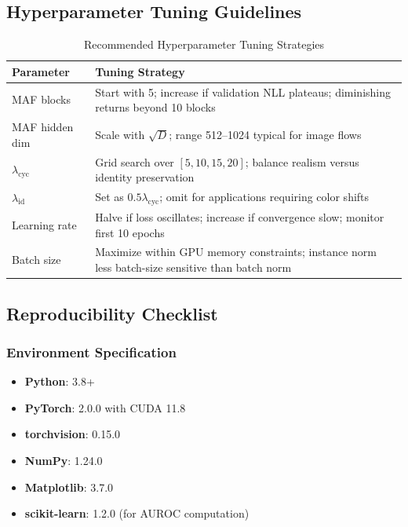 \documentclass[conference]{IEEEtran}
\begin{document}
\subsection{Hyperparameter Tuning Guidelines}
\begin{table}[!t]
\caption{Recommended Hyperparameter Tuning Strategies}
\label{tab:tuning}
\centering
\begin{tabular}{p{2.5cm}p{5cm}}
\hline
\textbf{Parameter} & \textbf{Tuning Strategy} \\
\hline
MAF blocks & Start with 5; increase if validation NLL plateaus; diminishing returns beyond 10 blocks \\
MAF hidden dim & Scale with $\sqrt{D}$; range 512–1024 typical for image flows \\
$\lambda_{\text{cyc}}$ & Grid search over $[5, 10, 15, 20]$; balance realism versus identity preservation \\
$\lambda_{\text{id}}$ & Set as $0.5 \lambda_{\text{cyc}}$; omit for applications requiring color shifts \\
Learning rate & Halve if loss oscillates; increase if convergence slow; monitor first 10 epochs \\
Batch size & Maximize within GPU memory constraints; instance norm less batch-size sensitive than batch norm \\
\hline
\end{tabular}
\end{table}

\subsection{Reproducibility Checklist}
\subsubsection{Environment Specification}
\begin{itemize}
\item \textbf{Python}: 3.8+
\item \textbf{PyTorch}: 2.0.0 with CUDA 11.8
\item \textbf{torchvision}: 0.15.0
\item \textbf{NumPy}: 1.24.0
\item \textbf{Matplotlib}: 3.7.0
\item \textbf{scikit-learn}: 1.2.0 (for AUROC computation)
\end{itemize}
\end{document}
